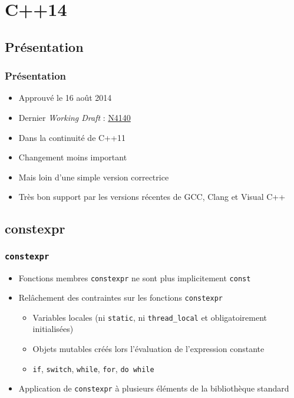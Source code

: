 \documentclass[C++.tex]{subfiles}
\begin{document}
\section{C++14}
\subsection*{Présentation}
\begin{frame}
	\frametitle{Présentation}
	\begin{itemize}
		\item Approuvé le 16 août 2014
		\item Dernier \textit{Working Draft} : \href{https://timsong-cpp.github.io/cppwp/n4140/draft.pdf}{N4140}
		\item Dans la continuité de C++11
		\item Changement moins important
		\item Mais loin d'une simple version correctrice
		\item Très bon support par les versions récentes de GCC, Clang et Visual C++
	\end{itemize}
\end{frame}

\subsection*{constexpr}
\begin{frame}[fragile]
	\frametitle{\lstinline|constexpr|}
	\begin{itemize}
		\item Fonctions membres \lstinline|constexpr| ne sont plus implicitement \lstinline|const|
		\item Relâchement des contraintes sur les fonctions \lstinline|constexpr|
		\begin{itemize}
			\item Variables locales (ni \lstinline|static|, ni \lstinline|thread_local| et obligatoirement initialisées)
			\item Objets mutables créés lors l'évaluation de l'expression constante
			\item \lstinline|if|, \lstinline|switch|, \lstinline|while|, \lstinline|for|, \lstinline|do while|
		\end{itemize}
		\item Application de \lstinline|constexpr| à plusieurs éléments de la bibliothèque standard
	\end{itemize}
\end{frame}
\end{document}
